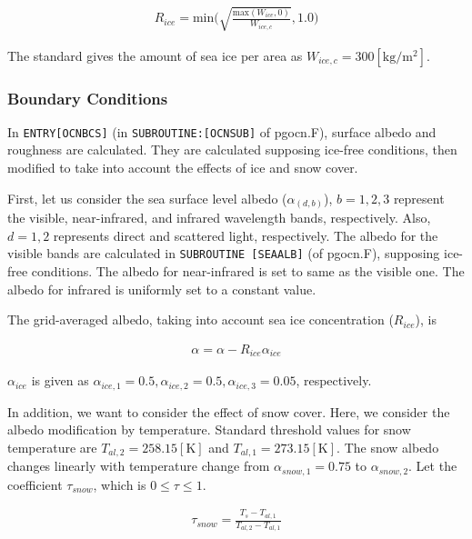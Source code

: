 \begin{eqnarray}
R_{ice} = \mathrm{min}\Big(\sqrt{\frac{\mathrm{max}(W_{ice},0)}{W_{ice,c}}},1.0\Big)
\end{eqnarray}

The standard gives the amount of sea ice per area as
\(W_{ice,c}=300 \mathrm{[kg/m^2]}\).

\hypertarget{boundary-conditions}{%
\subsubsection{Boundary Conditions}\label{boundary-conditions}}

In \texttt{ENTRY{[}OCNBCS{]}} (in \texttt{SUBROUTINE:{[}OCNSUB{]}} of
pgocn.F), surface albedo and roughness are calculated. They are
calculated supposing ice-free conditions, then modified to take into
account the effects of ice and snow cover.

First, let us consider the sea surface level albedo
(\(\alpha_{(d,b)}\)), \(b=1,2,3\) represent the visible, near-infrared,
and infrared wavelength bands, respectively. Also, \(d=1,2\) represents
direct and scattered light, respectively. The albedo for the visible
bands are calculated in \texttt{SUBROUTINE\ {[}SEAALB{]}} (of pgocn.F),
supposing ice-free conditions. The albedo for near-infrared is set to
same as the visible one. The albedo for infrared is uniformly set to a
constant value.

The grid-averaged albedo, taking into account sea ice concentration
(\(R_{ice}\)), is

\begin{eqnarray}
    \alpha = \alpha -R_{ice} \alpha_{ice}
\end{eqnarray}

\(\alpha_{ice}\) is given as
\(\alpha_{ice,1}=0.5,\alpha_{ice,2}=0.5,\alpha_{ice,3}=0.05\),
respectively.

In addition, we want to consider the effect of snow cover. Here, we
consider the albedo modification by temperature. Standard threshold
values for snow temperature are \(T_{al,2}=258.15 \mathrm{[K]}\) and
\(T_{al,1}=273.15 \mathrm{[K]}\). The snow albedo changes linearly with
temperature change from \(\alpha_{snow,1}=0.75\) to
\(\alpha_{ snow,2}\). Let the coefficient \(\tau_{snow}\), which is
\(0\le \tau \le 1\).

\begin{eqnarray}
\tau_{snow} = \frac{T_s - T_{al,1}}{T_{al,2}-T_{al,1}}
\end{eqnarray}

